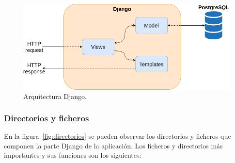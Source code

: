 \documentclass[a4paper, 12pt]{book}
\begin{document}
\begin{figure}[h]
  \centering
  \includegraphics[width=12cm, keepaspectratio]{img/django.png}
  \caption{Arquitectura Django.}\label{fig:django}
\end{figure}

\subsubsection{Directorios y ficheros}
\label{subsubsec:django_directorios}

En la figura~\ref{fig:directorios} se pueden observar los directorios y ficheros que componen la parte Django de la aplicación. Los ficheros y directorios más importantes y sus funciones son los siguientes:
\end{document}

